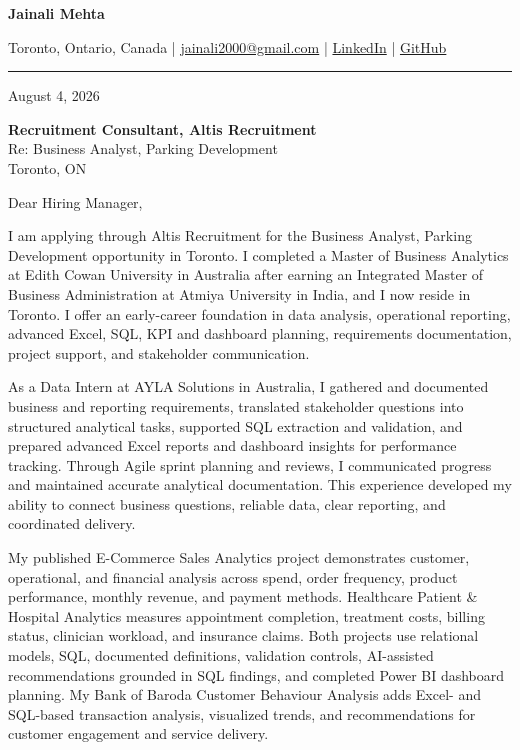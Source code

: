 \documentclass[letterpaper,10pt]{article}
\begin{document}
\begin{center}
  {\fontsize{17}{19}\selectfont\textbf{Jainali Mehta}}\par\vspace{2pt}
  \small Toronto, Ontario, Canada \;|\;
  \href{mailto:jainali2000@gmail.com}{jainali2000@gmail.com} \;|\;
  \href{https://www.linkedin.com/in/jainali-mehta}{LinkedIn} \;|\;
  \href{https://github.com/jainalimehta}{GitHub}
\end{center}
\vspace{-5pt}
\noindent\rule{\textwidth}{0.4pt}

August 4, 2026

\textbf{Recruitment Consultant, Altis Recruitment}\\
Re: Business Analyst, Parking Development\\
Toronto, ON

Dear Hiring Manager,

I am applying through Altis Recruitment for the Business Analyst, Parking Development opportunity in Toronto. I completed a Master of Business Analytics at Edith Cowan University in Australia after earning an Integrated Master of Business Administration at Atmiya University in India, and I now reside in Toronto. I offer an early-career foundation in data analysis, operational reporting, advanced Excel, SQL, KPI and dashboard planning, requirements documentation, project support, and stakeholder communication.

As a Data Intern at AYLA Solutions in Australia, I gathered and documented business and reporting requirements, translated stakeholder questions into structured analytical tasks, supported SQL extraction and validation, and prepared advanced Excel reports and dashboard insights for performance tracking. Through Agile sprint planning and reviews, I communicated progress and maintained accurate analytical documentation. This experience developed my ability to connect business questions, reliable data, clear reporting, and coordinated delivery.

My published E-Commerce Sales Analytics project demonstrates customer, operational, and financial analysis across spend, order frequency, product performance, monthly revenue, and payment methods. Healthcare Patient \& Hospital Analytics measures appointment completion, treatment costs, billing status, clinician workload, and insurance claims. Both projects use relational models, SQL, documented definitions, validation controls, AI-assisted recommendations grounded in SQL findings, and completed Power BI dashboard planning. My Bank of Baroda Customer Behaviour Analysis adds Excel- and SQL-based transaction analysis, visualized trends, and recommendations for customer engagement and service delivery.
\end{document}
